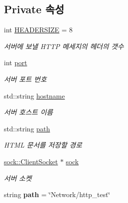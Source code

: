 \subsection*{Private 속성}
\begin{DoxyCompactItemize}
\item 
\mbox{\label{classps_1_1_a_p_i_ad2fc70fe286d0f2eba61b610e2b303df}} 
int \hyperlink{classps_1_1_a_p_i_ad2fc70fe286d0f2eba61b610e2b303df}{H\+E\+A\+D\+E\+R\+S\+I\+ZE} = 8
\begin{DoxyCompactList}\small\item\em 서버에 보낼 H\+T\+TP 메세지의 헤더의 갯수 \end{DoxyCompactList}\item 
\mbox{\label{classps_1_1_a_p_i_a58739732fd3c99f9725e5e1376bd5dd7}} 
int \hyperlink{classps_1_1_a_p_i_a58739732fd3c99f9725e5e1376bd5dd7}{port}
\begin{DoxyCompactList}\small\item\em 서버 포트 번호 \end{DoxyCompactList}\item 
\mbox{\label{classps_1_1_a_p_i_a0d5f99f63a0697e0764f3ee9794a5c26}} 
std\+::string \hyperlink{classps_1_1_a_p_i_a0d5f99f63a0697e0764f3ee9794a5c26}{hostname}
\begin{DoxyCompactList}\small\item\em 서버 호스트 이름 \end{DoxyCompactList}\item 
\mbox{\label{classps_1_1_a_p_i_ae93da803b67097f16a009d7acf78d957}} 
std\+::string \hyperlink{classps_1_1_a_p_i_ae93da803b67097f16a009d7acf78d957}{path}
\begin{DoxyCompactList}\small\item\em H\+T\+ML 문서를 저장할 경로 \end{DoxyCompactList}\item 
\mbox{\label{classps_1_1_a_p_i_af262de65cbf1ede5881c3c75d3cca049}} 
\hyperlink{classsock_1_1_client_socket}{sock\+::\+Client\+Socket} $\ast$ \hyperlink{classps_1_1_a_p_i_af262de65cbf1ede5881c3c75d3cca049}{sock}
\begin{DoxyCompactList}\small\item\em 서버 소켓 \end{DoxyCompactList}\item 
\mbox{\label{classps_1_1_a_p_i_a592e8c7a71b12ae09e28588b4b687fe9}} 
string {\bfseries path} = \char`\"{}Network/http\+\_\+test\char`\"{}
\end{DoxyCompactItemize}



